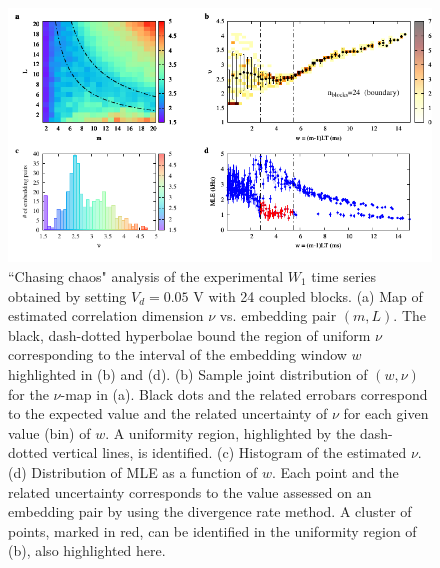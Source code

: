 \begin{figure}[H]
    \centering
    \includegraphics[width=\linewidth]{../blocks/24_blocks/2e5_points/plots/chaos_low.pdf}
    \caption{``Chasing chaos" analysis of the experimental $W_1$ time series obtained by setting $V_d=0.05$ V with 24 coupled blocks.
    (a) Map of estimated correlation dimension $\nu$ vs. embedding pair $(m, L)$.
    The black, dash-dotted hyperbolae bound the region of uniform $\nu$ corresponding to the interval of the
    embedding window $w$ highlighted in (b) and (d).
    (b) Sample joint distribution of $(w,\nu)$ for the $\nu$-map in (a).
    Black dots and the related errobars correspond to the expected value and the related uncertainty of $\nu$
    for each given value (bin) of $w$. A uniformity region, highlighted by the dash-dotted vertical lines,
    is identified. (c) Histogram of the estimated $\nu$. (d) Distribution of MLE as a function of $w$. Each point and the related
    uncertainty corresponds to the value assessed on an embedding pair by using the divergence rate method.
    A cluster of points, marked in red, can be identified in the uniformity region of (b), also highlighted here.}
    \label{fig:24 blocks chaos}
\end{figure}


